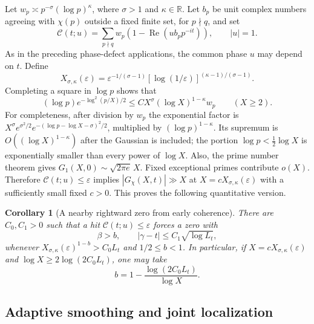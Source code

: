 \documentclass[11pt,letterpaper]{article}
\newtheorem{corollary}[theorem]{Corollary}
\theoremstyle{definition}
\theoremstyle{remark}
\renewcommand{\Re}{\operatorname{Re}}
\newcommand{\1}{\mathbf 1}
\begin{document}
Let $w_p\asymp p^{-\sigma}(\log p)^\kappa$, where $\sigma>1$ and
$\kappa\in\mathbb R$.  Let $b_p$ be unit complex numbers agreeing
with $\chi(p)$ outside a fixed finite set, for $p\nmid q$, and set
\[
 \mathcal C(t;u)=\sum_{p\nmid q}w_p
          (1-\Re(ub_pp^{-it})),\qquad |u|=1.
\]
As in the preceding phase-defect applications, the common phase $u$
may depend on $t$.  Define
\[
 X_{\sigma,\kappa}(\varepsilon)
 =\varepsilon^{-1/(\sigma-1)}
   [\log(1/\varepsilon)]^{(\kappa-1)/(\sigma-1)}.
\]
Completing a square in $\log p$ shows that
\begin{equation}
 (\log p)e^{-\log^2(p/X)/2}
 \le C X^\sigma(\log X)^{1-\kappa}w_p
 \qquad(X\ge2).
\label{p04:eq:zi-fixed-domination}
\end{equation}
For completeness, after division by $w_p$ the exponential factor is
$X^\sigma e^{\sigma^2/2}
e^{-(\log p-\log X-\sigma)^2/2}$, multiplied by
$(\log p)^{1-\kappa}$.  Its supremum is
$O((\log X)^{1-\kappa})$ after the Gaussian is included; the portion
$\log p<\tfrac12\log X$ is exponentially smaller than every power
of $\log X$.  Also, the prime number theorem gives
$G_1(X,0)\sim\sqrt{2\pi e}\,X$.
Fixed exceptional primes contribute $o(X)$.  Therefore
$\mathcal C(t;u)\le\varepsilon$ implies
$|G_\chi(X,t)|\gg X$ at
$X=cX_{\sigma,\kappa}(\varepsilon)$ with a sufficiently small
fixed $c>0$.  This proves the following quantitative version.

\begin{corollary}[A nearby rightward zero from early coherence]
\label{p04:cor:zi-coherence-nearby}
There are $C_0,C_1>0$ such that a hit
$\mathcal C(t;u)\le\varepsilon$ forces a zero with
\[
 \beta>b,\qquad |\gamma-t|\le C_1\sqrt{\log L_t},
\]
whenever
$X_{\sigma,\kappa}(\varepsilon)^{1-b}>C_0L_t$ and
$1/2\le b<1$.  In particular, if
$X=cX_{\sigma,\kappa}(\varepsilon)$ and
$\log X\ge2\log(2C_0L_t)$, one may take
\[
 b=1-\frac{\log(2C_0L_t)}{\log X}.
\]
\end{corollary}

\subsection{Adaptive smoothing and joint localization}
\end{document}

